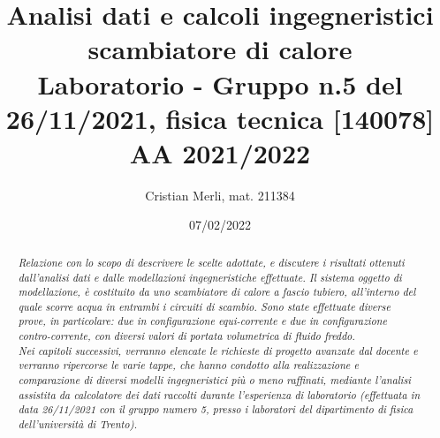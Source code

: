 \documentclass[a4paper,10pt]{article}                                                                                       %
\title{Analisi dati e calcoli ingegneristici scambiatore di calore\\                                                        %
\large Laboratorio - Gruppo n.5 del 26/11/2021, fisica tecnica [140078] AA 2021/2022}                                       %
\author{Cristian Merli, mat. 211384}                                                                                        %
\date{07/02/2022}                                                                                                           %
\begin{document}

\maketitle                                                                                                                  %
\vspace{5cm}                                                                                                                %
\begin{abstract}                                                                                                            %
  \noindent \textit{Relazione con lo scopo di descrivere le scelte adottate, e discutere i risultati  ottenuti dall'analisi
  dati e dalle modellazioni ingegneristiche effettuate. Il sistema oggetto di modellazione, è costituito da uno scambiatore
  di calore a fascio tubiero, all'interno del quale scorre acqua in entrambi i circuiti di scambio. Sono state effettuate
  diverse prove, in particolare: due in configurazione equi-corrente e due in configurazione contro-corrente, con diversi
  valori di portata volumetrica di fluido freddo.\\
  Nei capitoli successivi, verranno elencate le richieste di progetto avanzate dal docente e verranno ripercorse le varie
  tappe, che hanno condotto alla realizzazione e comparazione di diversi modelli ingegneristici più o meno raffinati,
  mediante l'analisi assistita da calcolatore dei dati raccolti durante l'esperienza di laboratorio (effettuata in data
  26/11/2021 con il gruppo numero 5, presso i laboratori del dipartimento di fisica dell'università di Trento).}
\end{abstract}                                                                                                              %
\pagebreak                                                                                                                  %
\end{document}

